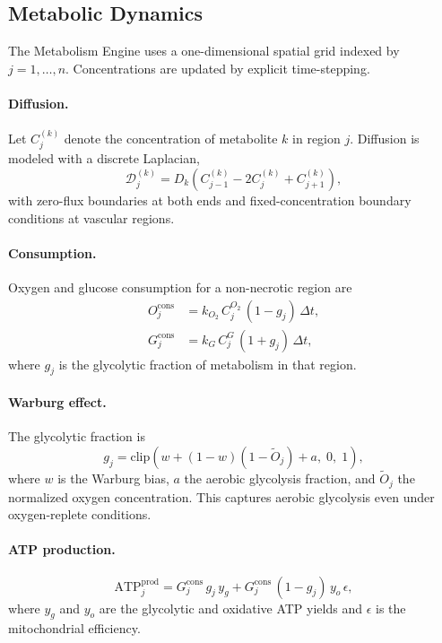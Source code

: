 \documentclass[12pt,a4paper]{article}
\begin{document}
\subsection{Metabolic Dynamics}

The Metabolism Engine uses a one-dimensional spatial grid indexed by $j = 1, \ldots, n$. Concentrations are updated by explicit time-stepping.

\paragraph{Diffusion.}
Let $C^{(k)}_j$ denote the concentration of metabolite $k$ in region $j$. Diffusion is modeled with a discrete Laplacian,
\begin{equation}
\mathcal{D}^{(k)}_j = D_k \left( C^{(k)}_{j-1} - 2 C^{(k)}_j + C^{(k)}_{j+1} \right),
\end{equation}
with zero-flux boundaries at both ends and fixed-concentration boundary conditions at vascular regions.

\paragraph{Consumption.}
Oxygen and glucose consumption for a non-necrotic region are
\begin{align}
O_j^{\mathrm{cons}} &= k_{O_2} \, C^{O_2}_j \, (1 - g_j) \, \Delta t, \\
G_j^{\mathrm{cons}} &= k_{G} \, C^{G}_j \, (1 + g_j) \, \Delta t,
\end{align}
where $g_j$ is the glycolytic fraction of metabolism in that region.

\paragraph{Warburg effect.}
The glycolytic fraction is
\begin{equation}
g_j = \mathrm{clip}\!\left( w + (1 - w)(1 - \tilde{O}_j) + a, \; 0, \; 1 \right),
\end{equation}
where $w$ is the Warburg bias, $a$ the aerobic glycolysis fraction, and $\tilde{O}_j$ the normalized oxygen concentration. This captures aerobic glycolysis even under oxygen-replete conditions.

\paragraph{ATP production.}
\begin{equation}
\mathrm{ATP}_j^{\mathrm{prod}} = G_j^{\mathrm{cons}} \, g_j \, y_g + G_j^{\mathrm{cons}} \,(1 - g_j) \, y_o \, \epsilon,
\end{equation}
where $y_g$ and $y_o$ are the glycolytic and oxidative ATP yields and $\epsilon$ is the mitochondrial efficiency.
\end{document}
